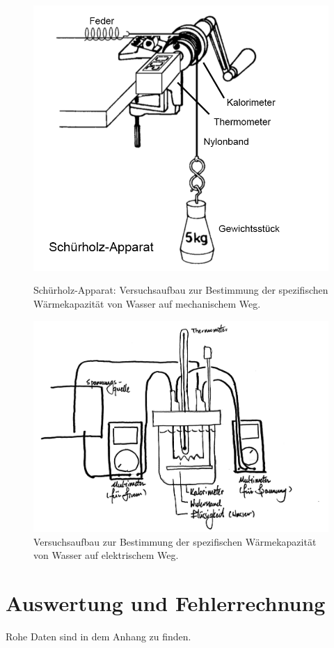 \documentclass[11pt,a4paper]{article} %
\begin{document}
\begin{figure}
	\centering
	\includegraphics[scale=0.5]{fig1}
	\caption{Schürholz-Apparat: Versuchsaufbau zur Bestimmung der spezifischen Wärmekapazität von
		Wasser auf mechanischem Weg.}
	
	\includegraphics[scale=0.10]{fig2}
	\caption{ Versuchsaufbau zur Bestimmung der spezifischen Wärmekapazität von
		Wasser auf elektrischem Weg.}
\end{figure}
\newpage

\section{Auswertung und Fehlerrechnung}
Rohe Daten sind in dem Anhang zu finden. 
\end{document}
